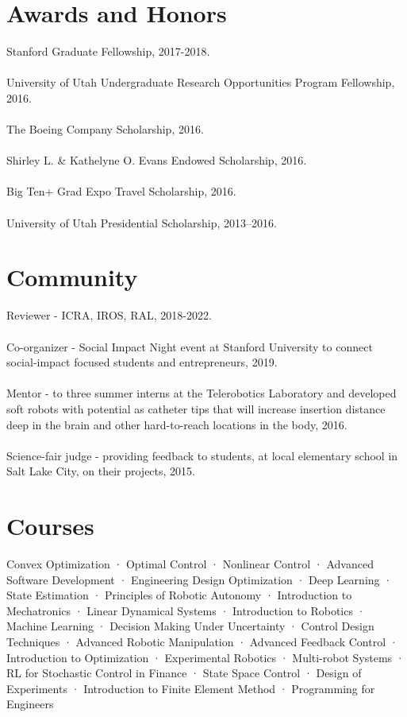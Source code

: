 \documentclass[10pt]{article}
\begin{document}
\section*{Awards and Honors}
Stanford Graduate Fellowship,  2017-2018.
\\
\\
University of Utah Undergraduate Research Opportunities Program Fellowship, 2016.
\\
\\
The Boeing Company Scholarship, 2016.
\\
\\
Shirley L. \& Kathelyne O. Evans Endowed Scholarship, 2016.
\\
\\
Big Ten+ Grad Expo Travel Scholarship, 2016.
\\
\\
University of Utah Presidential Scholarship, 2013–2016.

\section*{Community}
Reviewer - ICRA, IROS, RAL, 2018-2022.
\\
\\
Co-organizer - Social Impact Night event at Stanford University to connect social-impact focused students and entrepreneurs, 2019.
\\
\\
Mentor - to three summer interns at the Telerobotics Laboratory and developed soft robots with potential as catheter tips that will increase insertion distance deep in the brain and other hard-to-reach locations in the body, 2016.
\\
\\
Science-fair judge - providing feedback to students, at local elementary school in Salt Lake City, on their projects, 2015.

\section*{Courses}
Convex Optimization · Optimal Control · Nonlinear Control · Advanced Software Development · Engineering Design Optimization · Deep Learning · State Estimation · Principles of Robotic Autonomy · Introduction to Mechatronics · Linear Dynamical Systems · Introduction to Robotics · Machine Learning · Decision Making Under Uncertainty · Control Design Techniques · Advanced Robotic Manipulation · Advanced Feedback Control · Introduction to Optimization · Experimental Robotics · Multi-robot Systems · RL for Stochastic Control in Finance · State Space Control · Design of Experiments · Introduction to Finite Element Method · Programming for Engineers 
\end{document}
